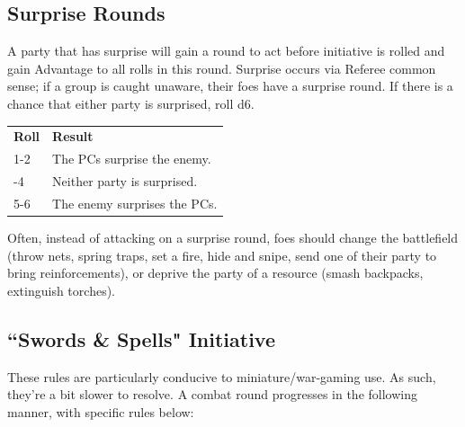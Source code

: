 \documentclass[twoside]{article}
\begin{document}
\subsection*{Surprise Rounds}

A party that has surprise will gain a round to act before initiative is rolled and gain Advantage to all rolls in this round. Surprise occurs via Referee common sense; if a group is caught unaware, their foes have a surprise round. If there is a chance that either party is surprised, roll d6.

\bigbreak

\begin{center}
\noindent\begin{tabular}{>{\centering\arraybackslash}p{}p{}}
\textbf{Roll}&\textbf{Result}\\
\rowcolor[gray]{0.75}1-2&The PCs surprise the enemy.\\
3-4&Neither party is surprised.\\
\rowcolor[gray]{0.75}5-6&The enemy surprises the PCs.\\
\end{tabular}
\end{center}

\bigbreak

Often, instead of attacking on a surprise round, foes should change the battlefield (throw nets, spring traps, set a fire, hide and snipe, send one of their party to bring reinforcements), or deprive the party of a resource (smash backpacks, extinguish torches).

\subsection*{``Swords \& Spells" Initiative}

These rules are particularly conducive to miniature/war-gaming use. As such, they're a bit slower to resolve. A combat round progresses in the following manner, with specific rules below:
\end{document}
